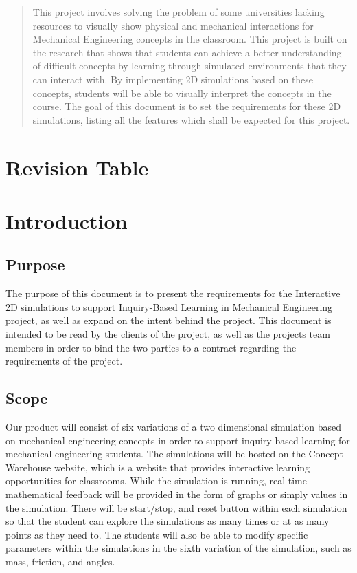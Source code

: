 \documentclass[onecolumn, draftclsnofoot,10pt, compsoc]{IEEEtran}
\begin{document}
\begin{titlepage}
\begin{singlespace}
{        }
        \begin{abstract}
This project involves solving the problem of some universities lacking resources to visually show physical and mechanical interactions for Mechanical Engineering concepts in the classroom.
This project is built on the research that shows that students can achieve a better understanding of difficult concepts by learning through simulated environments that they can interact with.
By implementing 2D simulations based on these concepts, students will be able to visually interpret the concepts in the course.
The goal of this document is to set the requirements for these 2D simulations, listing all the features which shall be expected for this project.
        \end{abstract}     
    \end{singlespace}
\end{titlepage}
\newpage
{}
\tableofcontents
\clearpage

\section{Revision Table}


\section{Introduction}
\subsection{Purpose}
The purpose of this document is to present the requirements for the Interactive 2D simulations to support Inquiry-Based Learning in Mechanical Engineering project, as well as expand on the intent behind the project. This document is intended to be read by the clients of the project, as well as the projects team members in order to bind the two parties to a contract regarding the requirements of the project.
\subsection{Scope}
Our product will consist of six variations of a two dimensional simulation based on mechanical engineering concepts in order to support inquiry based learning for mechanical engineering students. The simulations will be hosted on the Concept Warehouse website, which is a website that provides interactive learning opportunities for classrooms. While the simulation is running, real time mathematical feedback will be provided in the form of graphs or simply values in the simulation. There will be start/stop, and reset button within each simulation so that the student can explore the simulations as many times or at as many points as they need to. The students will also be able to modify specific parameters within the simulations in the sixth variation of the simulation, such as mass, friction, and angles.
\end{document}
